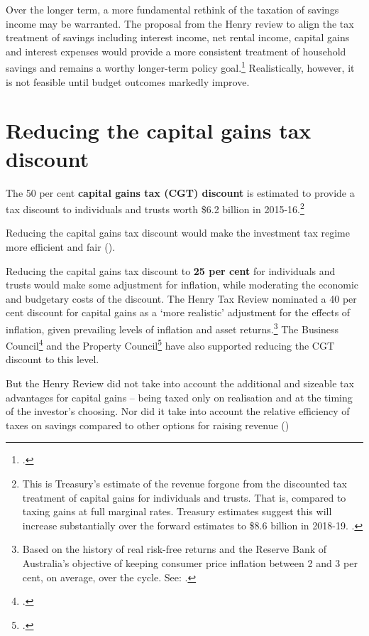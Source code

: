 Over the longer term, a more fundamental rethink of the taxation of savings income may be warranted. The proposal from the Henry review to align the tax treatment of savings including interest income, net rental income, capital gains and interest expenses would provide a more consistent treatment of household savings and remains a worthy longer-term policy goal.\footcite[][62--75]{HenryTaxReview2010} Realistically, however, it is not feasible until budget outcomes markedly improve.

\section{Reducing the capital gains tax discount}
The 50 per cent \textbf{capital gains tax (CGT) discount} is estimated to provide a tax discount to individuals and trusts worth \$6.2 billion in 2015-16.\footnote{This is Treasury’s estimate of the revenue forgone from the discounted tax treatment of capital gains for individuals and trusts. That is, compared to taxing gains at full marginal rates. Treasury estimates suggest this will increase substantially over the forward estimates to \$8.6 billion in 2018-19. \textcite[][4--21]{Treasury2016TES}.}   

Reducing the capital gains tax discount would make the investment tax regime more efficient and fair (). 

Reducing the capital gains tax discount to \textbf{25 per cent} for individuals and trusts would make some adjustment for inflation, while moderating the economic and budgetary costs of the discount. The Henry Tax Review nominated a 40 per cent discount for capital gains as a ‘more realistic’ adjustment for the effects of inflation, given prevailing levels of inflation and asset returns.\footnote{Based on the history of real risk-free returns and the Reserve Bank of Australia’s objective of keeping consumer price inflation between 2 and 3 per cent, on average, over the cycle. See: \textcite[][72]{HenryTaxReview2010}.}  The Business Council\footcite[][64]{BCA2016}  and the Property Council\footcite{Vickery2016}  have also supported reducing the CGT discount to this level. 

But the Henry Review did not take into account the additional and sizeable tax advantages for capital gains – being taxed only on realisation and at the timing of the investor’s choosing. Nor did it take into account the relative efficiency of taxes on savings compared to other options for raising revenue ()

